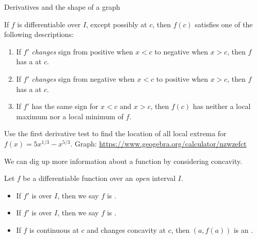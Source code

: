 \documentclass[../main.tex]{subfiles}
\begin{document}
\begin{lesson}{Derivatives and the shape of a graph}
\begin{mdframed}[style=withref-compact]
    If \(f\) is differentiable over \(I\), except possibly at \(c\), then \(f(c)\) satisfies one of the following descriptions:
    \begin{enumerate}
      \item If \(f'\) \emph{changes} sign from positive when \(x < c\) to negative when \(x > c\), then \(f\) has a \underline{\hspace{2in}} at \(c\).
      \item If \(f'\) \emph{changes} sign from negative when \(x < c\) to positive when \(x > c\), then \(f\) has a \underline{\hspace{2in}} at \(c\).
      \item If \(f'\) has the same sign for \(x < c\) and \(x > c\), then \(f(c)\) has neither a local maximum nor a local minimum of \(f\).
    \end{enumerate}

  \end{mdframed}

  \begin{example} \label{ex:first-derivative}
    Use the first derivative test to find the location of all local extrema for \(f(x) = 5x^{1/3} - x^{5/3}\). Graph: \url{https://www.geogebra.org/calculator/nzwzefct}

  \end{example}
  \clearpage

  We can dig up more information about a function by considering concavity.
  \begin{mdframed}[style=withref-compact]
    Let \(f\) be a differentiable function over an \emph{open} interval \(I\).
    \begin{itemize}
      \item If \(f'\) is \underline{\hspace{1in}} over \(I\), then we say \(f\) is .
      \item If \(f'\) is \underline{\hspace{1in}} over \(I\), then we say \(f\) is .
      \item If \(f\) is continuous at \(c\) and changes concavity at \(c\), then \((a,f(a))\) is an . 
    \end{itemize}

  \end{mdframed}


\end{lesson}
\end{document}
